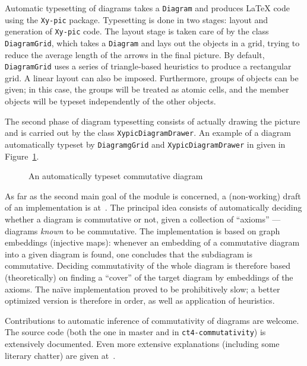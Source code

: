 Automatic typesetting of diagrams takes a \texttt{Diagram} and produces \LaTeX{}
code using the \texttt{Xy-pic} package.  Typesetting is done in two stages:
layout and generation of \texttt{Xy-pic} code.  The layout stage is taken care
of by the class \texttt{DiagramGrid}, which takes a \texttt{Diagram} and lays out
the objects in a grid, trying to reduce the average length of the arrows in the
final picture.  By default, \texttt{DiagramGrid} uses a series of triangle-based
heuristics to produce a rectangular grid.  A linear layout can also be imposed.
Furthermore, groups of objects can be given; in this case, the groups will be
treated as atomic cells, and the member objects will be typeset independently of
the other objects.

The second phase of diagram typesetting consists of actually drawing the picture
and is carried out by the class \texttt{XypicDiagramDrawer}.  An example of a
diagram automatically typeset by \texttt{DiagramgGrid} and
\texttt{XypicDiagramDrawer} in given in Figure~\ref{fig:cat:loops}.
\begin{figure}[h]
  \centerline{
  }
  \caption{An automatically typeset commutative diagram}
  \label{fig:cat:loops}
\end{figure}

As far as the second main goal of the module is concerned, a (non-working) draft
of an implementation is at~\cite{ct4commutativity}.  The principal idea consists
of automatically deciding whether a diagram is commutative or not, given a
collection of ``axioms'' --- diagrams \textit{known} to be commutative.  The
implementation is based on graph embeddings (injective maps): whenever an
embedding of a commutative diagram into a given diagram is found, one concludes
that the subdiagram is commutative.  Deciding commutativity of the whole diagram
is therefore based (theoretically) on finding a ``cover'' of the target diagram
by embeddings of the axioms.  The na\"{i}ve implementation proved to be
prohibitively slow; a better optimized version is therefore in order, as well as
application of heuristics.

Contributions to automatic inference of commutativity of diagrams are welcome.
The source code (both the one in master and in \texttt{ct4-commutativity}) is
extensively documented.  Even more extensive explanations (including some
literary chatter) are given at~\cite{scolobb}.
